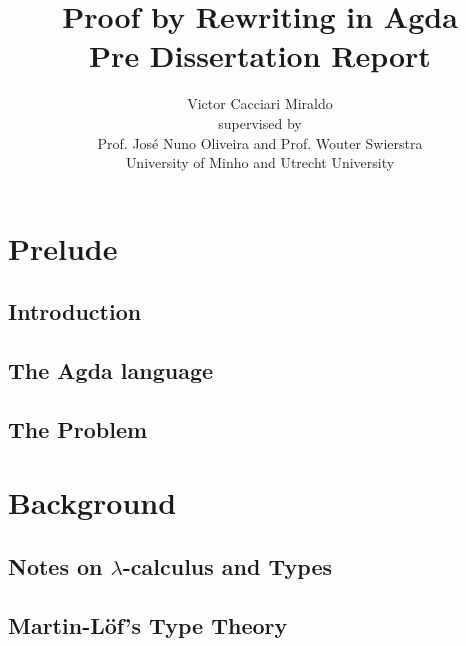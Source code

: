 \documentclass{report}
\title{Proof by Rewriting in Agda\\ \small{Pre Dissertation Report}}
\author{Victor Cacciari Miraldo\\[2cm] %
\small{supervised by} \\
Prof. José Nuno Oliveira and Prof. Wouter Swierstra \\
University of Minho and Utrecht University}
\begin{document}
\maketitle
\tableofcontents

\theoremstyle{plain}
\newtheorem{thm}{Theorem}[chapter]
\newtheorem{crl}{Corolary}[chapter]
\newtheorem{prob}{Problem}[chapter]
\newtheorem{prop}{Proposition}[chapter]

\theoremstyle{definition}
\newtheorem{lemma}{Lemma}[chapter]
\newtheorem{mydef}{Definition}[chapter]
\newtheorem{notation}{Notation}[chapter]

\theoremstyle{remark}
\newtheorem{nota}{Note}[chapter]

\chapter{Prelude}
\label{chap:prelude}

  \section{Introduction}
  \label{sec:prelude:introduction}
  
  
  \section{The Agda language}
  \label{sec:prelude:agdalanguage}
  
  
  \section{The Problem}
  \label{sec:prelude:theproblem}
  
  
\chapter{Background}
\label{chap:background}


  \section{Notes on $\lambda$-calculus and Types}
  \label{sec:background:lambdacalculus}
  
  
  \section{Martin-Löf's Type Theory}
  \label{sec:background:martinlof}
  
  
\end{document}
